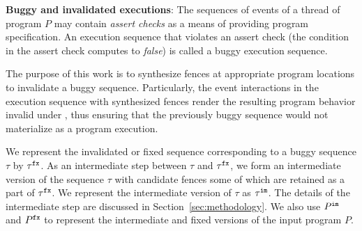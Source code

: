 \noindent
{\bf Buggy and invalidated executions}: The sequences of events of a 
thread of 
program $P$ may contain {\em assert checks} as a means of providing
program specification. An execution sequence that violates an 
assert check (\ie the condition in the assert check computes to
{\em false}) is called a buggy execution sequence.

The purpose of this work is to synthesize \cc fences at appropriate
program locations to invalidate a buggy sequence. Particularly, the
event interactions in the execution sequence with synthesized fences
render the resulting program behavior invalid under \cc, thus ensuring
that the previously buggy sequence would not materialize as a 
\cc program execution.

We represent the invalidated or fixed sequence corresponding to a 
buggy sequence $\tau$ by ${\tau}^{\mathtt{fx}}$. 
%
As an intermediate step between $\tau$ and ${\tau}^{\mathtt{fx}}$, we form an 
intermediate version of the sequence $\tau$ with candidate fences
some of which are retained as a part of ${\tau}^{\mathtt{fx}}$. We represent
the intermediate version of $\tau$ as ${\tau}^{\mathtt{im}}$. The details
of the intermediate step are discussed in Section~\ref{sec:methodology}.
%
We also use ${P}^{\mathtt{im}}$ and ${P}^{\mathtt{fx}}$ to represent the intermediate and
fixed versions of the input program $P$.
